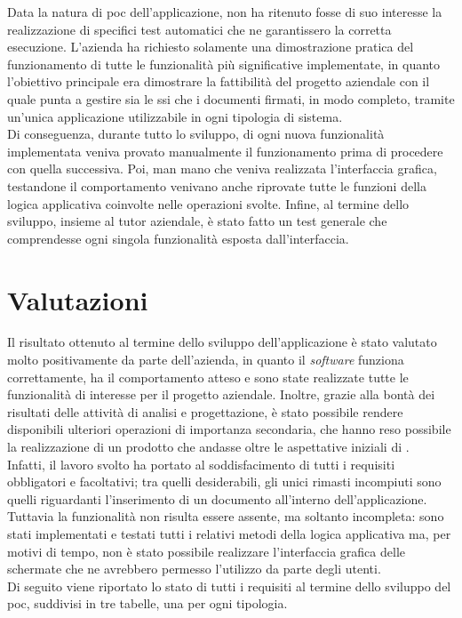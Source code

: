 Data la natura di \gls{poc} dell'applicazione, \myCompany{} \companyTitle{} non ha ritenuto fosse di suo interesse la realizzazione di specifici test automatici che ne garantissero la corretta esecuzione. L'azienda ha richiesto solamente una dimostrazione pratica del funzionamento di tutte le funzionalità più significative implementate, in quanto l'obiettivo principale era dimostrare la fattibilità del progetto aziendale con il quale punta a gestire sia le \gls{ssi} che i documenti firmati, in modo completo, tramite un'unica applicazione utilizzabile in ogni tipologia di sistema.\\
Di conseguenza, durante tutto lo sviluppo, di ogni nuova funzionalità implementata veniva provato manualmente il funzionamento prima di procedere con quella successiva. Poi, man mano che veniva realizzata l'interfaccia grafica, testandone il comportamento venivano anche riprovate tutte le funzioni della logica applicativa coinvolte nelle operazioni svolte. Infine, al termine dello sviluppo, insieme al tutor aziendale, è stato fatto un test generale che comprendesse ogni singola funzionalità esposta dall'interfaccia.

\section{Valutazioni}

Il risultato ottenuto al termine dello sviluppo dell'applicazione è stato valutato molto positivamente da parte dell'azienda, in quanto il \textit{software} funziona correttamente, ha il comportamento atteso e sono state realizzate tutte le funzionalità di interesse per il progetto aziendale. Inoltre, grazie alla bontà dei risultati delle attività di analisi e progettazione, è stato possibile rendere disponibili ulteriori operazioni di importanza secondaria, che hanno reso possibile la realizzazione di un prodotto che andasse oltre le aspettative iniziali di \myCompany{} \companyTitle{}.\\
Infatti, il lavoro svolto ha portato al soddisfacimento di tutti i requisiti obbligatori e facoltativi; tra quelli desiderabili, gli unici rimasti incompiuti sono quelli riguardanti l'inserimento di un documento all'interno dell'applicazione. Tuttavia la funzionalità non risulta essere assente, ma soltanto incompleta: sono stati implementati e testati tutti i relativi metodi della logica applicativa ma, per motivi di tempo, non è stato possibile realizzare l'interfaccia grafica delle schermate che ne avrebbero permesso l'utilizzo da parte degli utenti.\\
Di seguito viene riportato lo stato di tutti i requisiti al termine dello sviluppo del \gls{poc}, suddivisi in tre tabelle, una per ogni tipologia.

